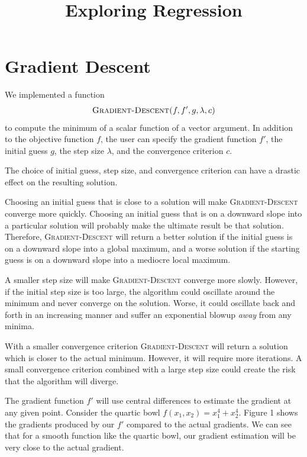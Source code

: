 \documentclass{sigchi}
\begin{document}
\title{Exploring Regression}


\maketitle

\large

\section{Gradient Descent}

We implemented a function
\[\textsc{Gradient-Descent($f, f', g, \lambda, c$)}\]
to compute the minimum of a scalar function of a vector argument. In addition to the objective function $f$, the user can specify the gradient function $f'$, the initial guess $g$, the step size $\lambda$, and the convergence criterion $c$.

The choice of initial guess, step size, and convergence criterion can have a drastic effect on the resulting solution.

Choosing an initial guess that is close to a solution will make \textsc{Gradient-Descent} converge more quickly. Choosing an initial guess that is on a downward slope into a particular solution will probably make the ultimate result be that solution. Therefore, \textsc{Gradient-Descent} will return a better solution if the initial guess is on a downward slope into a global maximum, and a worse solution if the starting guess is on a downward slope into a mediocre local maximum.

A smaller step size will make \textsc{Gradient-Descent} converge more slowly. However, if the initial step size is too large, the algorithm could oscillate around the minimum and never converge on the solution. Worse, it could oscillate back and forth in an increasing manner and suffer an exponential blowup \emph{away} from any minima.

With a smaller convergence criterion \textsc{Gradient-Descent} will return a solution which is closer to the actual minimum. However, it will require more iterations. A small convergence criterion combined with a large step size could create the risk that the algorithm will diverge.

The gradient function $f'$ will use central differences to estimate the gradient at any given point. Consider the quartic bowl $f(x_1, x_2) = x_1^4 + x_2^4$. Figure 1 shows the gradients produced by our $f'$ compared to the actual gradients. We can see that for a smooth function like the quartic bowl, our gradient estimation will be very close to the actual gradient.
\end{document}
